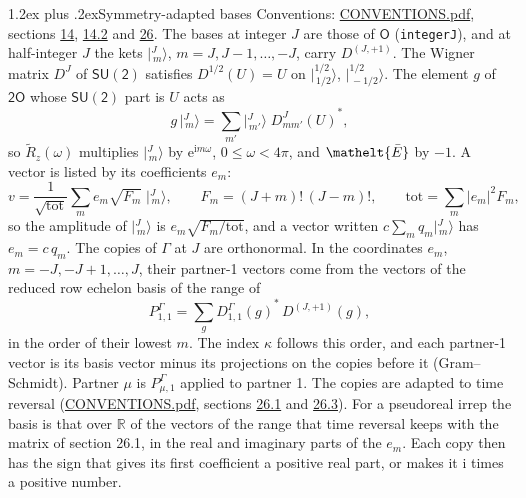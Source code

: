 \documentclass[10pt,a4paper]{article}
\makeatletter
\renewcommand\section{\@startsection{section}{1}{\z@}{-3ex plus -1ex minus -.2ex}%
  {1.2ex plus .2ex}{\normalfont\large\sffamily\bfseries\color{parttitle}}}
\numberwithin{equation}{section}
\newcommand{\eltfont}[1]{{\let\sigma\eltsigma\mathelt{#1}}}
\newcommand{\grp}[1]{\mathsf{#1}}
\newcommand{\elt}[1]{\eltfont{#1}}
\newcommand{\iunit}{\mathrm{i}}
\newcommand{\expe}{\mathrm{e}}
\newcommand{\irrJp}[2]{D^{(#1,#2)}}
\newcommand{\repD}[1]{D^{#1}}
\newcommand{\wignerD}[1]{D^{#1}}
\newcommand{\conj}[1]{{#1}^{*}}
\newcommand{\mult}{\kappa}
\newcommand{\intx}{\mu}
\newcommand{\jm}[2]{\bigl\lvert{}^{#1}_{\,#2}\bigr\rangle}
\newcommand{\barred}[1]{\bar{#1}}
\newcommand{\lift}[1]{\tilde{#1}}
\makeatother
\begin{document}
\section{Symmetry-adapted bases}\label{s:bases}
Conventions: \href{../../CONVENTIONS.pdf}{CONVENTIONS.pdf}, sections \href{../../../rotation/CONVENTIONS.pdf\#conv.14}{14}, \href{../../../rotation/CONVENTIONS.pdf\#conv.14.2}{14.2} and \href{../../CONVENTIONS.pdf\#conv.26}{26}.
\leavevmode\label{n:index.m}\label{n:vector.ket}The bases at integer $J$ are those of \href{../../../rotation/data/pdf/O.pdf}{$\grp{O}$} (\texttt{integerJ}), and at half-integer $J$ the kets $\jm{J}{m}$, $m = J, J-1, \dots, -J$, carry $\irrJp{J}{+1}$. \label{n:matrix.wigner}The Wigner matrix $\wignerD{J}$ of $\grp{SU(2)}$ satisfies $\wignerD{1/2}(U) = U$ on $\jm{1/2}{1/2}$, $\jm{1/2}{-1/2}$. The element $g$ of $\grp{2O}$ whose $\grp{SU(2)}$ part is $U$ acts as
\begin{equation}\label{e:action}g\,\jm{J}{m} = \sum_{m'} \jm{J}{m'}\; \conj{\wignerD{J}_{m m'}(U)},\end{equation}
so $\lift{R}_{z}(\omega)$ multiplies $\jm{J}{m}$ by $\expe^{\iunit m\omega}$, $0 \le \omega < 4\pi$, and $\elt{\barred{E}}$ by $-1$. \label{n:index.ketcoefficient}\label{n:vector.basis.symmetry}\label{n:index.ketweight}\label{n:index.total}A vector is listed by its coefficients $e_m$:
\begin{equation}\label{e:ket}v = \frac{1}{\sqrt{\mathrm{tot}}}\sum_m e_m\sqrt{F_m}\;\jm{J}{m},\qquad F_m = (J+m)!\,(J-m)!,\qquad \mathrm{tot} = \sum_m |e_m|^2F_m,\end{equation}
\leavevmode\label{n:index.factor.c}so the amplitude of $\jm{J}{m}$ is $e_m\sqrt{F_m/\mathrm{tot}}$, and a vector written $c\sum_m q_m\jm{J}{m}$ has $e_m = c\,q_m$.
The copies of $\Gamma$ at $J$ are orthonormal. \label{n:matrix.projector}In the coordinates $e_m$, $m = -J, -J+1, \dots, J$, their partner-1 vectors come from the vectors of the reduced row echelon basis of the range of
\begin{equation}\label{e:projector}P^\Gamma_{1,1} = \sum_g \conj{\repD{\Gamma}_{1,1}(g)}\,\irrJp{J}{+1}(g),\end{equation}
in the order of their lowest $m$. The index $\mult$ follows this order, and each partner-1 vector is its basis vector minus its projections on the copies before it (Gram--Schmidt). Partner $\intx$ is $P^\Gamma_{\intx,1}$ applied to partner 1. The copies are adapted to time reversal (\href{../../CONVENTIONS.pdf}{CONVENTIONS.pdf}, sections \href{../../CONVENTIONS.pdf\#conv.26.1}{26.1} and \href{../../CONVENTIONS.pdf\#conv.26.3}{26.3}). For a pseudoreal irrep the basis is that over $\mathbb{R}$ of the vectors of the range that time reversal keeps with the matrix of section 26.1, in the real and imaginary parts of the $e_m$. Each copy then has the sign that gives its first coefficient a positive real part, or makes it $\iunit$ times a positive number.
\end{document}
